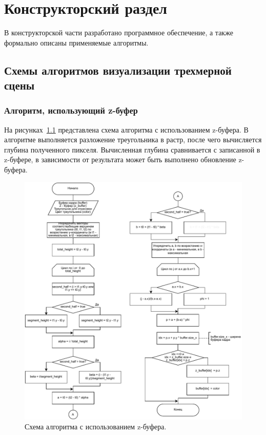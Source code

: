 \chapter{Конструкторский раздел}	
В конструкторской части разработано программное обеспечение, а также формально описаны применяемые алгоритмы.

\section{Схемы алгоритмов визуализации трехмерной сцены}
\subsection{Алгоритм, использующий z-буфер}
На рисунках~\ref{fig:z_buf_2} представлена схема алгоритма с использованием z-буфера. В алгоритме выполняется разложение треугольника в растр, после чего вычисляется глубина полученного пикселя. Вычисленная глубина сравнивается с записанной в z-буфере, в зависимости от результата может быть выполнено обновление z-буфера.  

\begin{figure}[H]
	\centering
	\includegraphics[width=1.0\textwidth, page=1]{assets/img/z-bufer-full.pdf}   
	\caption{Схема алгоритма с использованием z-буфера.}
	\label{fig:z_buf_2}
\end{figure}


